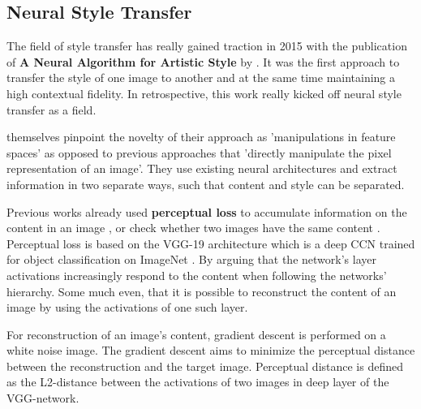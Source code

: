 


\subsection{Neural Style Transfer}
The field of style transfer has really gained traction in 2015 with the publication of \textbf{A Neural Algorithm for Artistic Style} by \citeauthor*{gatys}.
It was the first approach to transfer the style of one image to another and at the same time maintaining a high contextual fidelity.
In retrospective, this work really kicked off neural style transfer as a field.

\citeauthor*{gatys} themselves pinpoint the novelty of their approach as 'manipulations in feature spaces' as opposed to previous approaches that 'directly manipulate the pixel representation of an image'\cite{gatys}.
They use existing neural architectures and extract information in two separate ways, such that content and style can be separated.

Previous works already used \textbf{perceptual loss} to accumulate information on the content in an image \cite{percep_loss}, or check whether two images have the same content \cite{other_percep_loss}.
Perceptual loss is based on the VGG-19 architecture \cite{VGG} which is a deep CCN trained for object classification on ImageNet \cite{imagenet}.
By arguing that the network's layer activations increasingly respond to the content when following the networks' hierarchy.
Some much even, that it is possible to reconstruct the content of an image by using the activations of one such layer.

For reconstruction of an image's content, gradient descent is performed on a white noise image.
The gradient descent aims to minimize the perceptual distance between the reconstruction and the target image.
Perceptual distance is defined as the L2-distance between the activations of two images in deep layer of the VGG-network.

